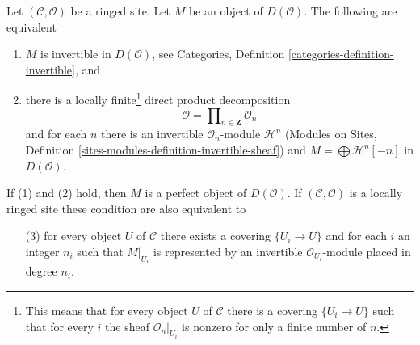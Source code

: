 \begin{lemma}
\label{lemma-invertible-derived}
Let $(\mathcal{C}, \mathcal{O})$ be a ringed site. Let $M$ be an object
of $D(\mathcal{O})$. The following are equivalent
\begin{enumerate}
\item $M$ is invertible in $D(\mathcal{O})$, see
Categories, Definition \ref{categories-definition-invertible}, and
\item there is a locally finite\footnote{This means that for every
object $U$ of $\mathcal{C}$ there is a covering $\{U_i \to U\}$
such that for every $i$ the sheaf $\mathcal{O}_n|_{U_i}$ is nonzero
for only a finite number of $n$.} direct product decomposition
$$
\mathcal{O} = \prod\nolimits_{n \in \mathbf{Z}} \mathcal{O}_n
$$
and for each $n$ there is an invertible $\mathcal{O}_n$-module
$\mathcal{H}^n$
(Modules on Sites, Definition \ref{sites-modules-definition-invertible-sheaf})
and $M = \bigoplus \mathcal{H}^n[-n]$ in $D(\mathcal{O})$.
\end{enumerate}
If (1) and (2) hold, then $M$ is a perfect object of $D(\mathcal{O})$. If
$(\mathcal{C}, \mathcal{O})$ is a locally ringed site these condition
are also equivalent to
\begin{enumerate}
\item[(3)] for every object $U$ of $\mathcal{C}$ there exists a
covering $\{U_i \to U\}$ and for each $i$ an integer $n_i$ such that
$M|_{U_i}$ is represented by an invertible $\mathcal{O}_{U_i}$-module
placed in degree $n_i$.
\end{enumerate}
\end{lemma}

